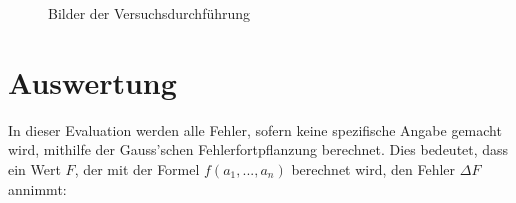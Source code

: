 \documentclass{article}
\begin{document}
\begin{figure}[!p]
  \centering
  \hfill
  \hfill
  \caption{Bilder der Versuchsdurchführung}
  \label{fig:Durchführung}
\end{figure}

\clearpage
\newpage
\section{Auswertung}

In dieser Evaluation werden alle Fehler, sofern keine spezifische Angabe gemacht wird, mithilfe der Gauss'schen Fehlerfortpflanzung berechnet. Dies bedeutet, dass ein Wert $F$, der mit der Formel $f(a_1, ..., a_n)$ berechnet wird, den Fehler $\Delta F$ annimmt:
\end{document}
